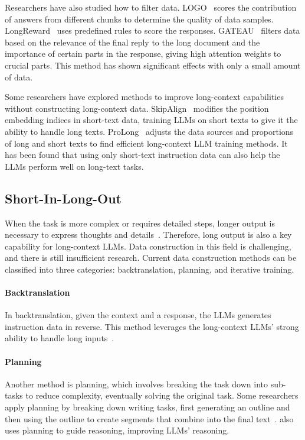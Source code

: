 Researchers have also studied how to filter data. LOGO~\citep{tang2024logo} scores the contribution of answers from different chunks to determine the quality of data samples. LongReward~\citep{zhang2024longreward} uses predefined rules to score the responses. GATEAU~\citep{si2024selecting} filters data based on the relevance of the final reply to the long document and the importance of certain parts in the response, giving high attention weights to crucial parts. This method has shown significant effects with only a small amount of data.

Some researchers have explored methods to improve long-context capabilities without constructing long-context data. SkipAlign~\citep{wu2024skipalign} modifies the position embedding indices in short-text data, training LLMs on short texts to give it the ability to handle long texts. ProLong~\citep{gao2024train} adjusts the data sources and proportions of long and short texts to find efficient long-context LLM training methods. It has been found that using only short-text instruction data can also help the LLMs perform well on long-text tasks.

\subsection{Short-In-Long-Out}

When the task is more complex or requires detailed steps, longer output is necessary to express thoughts and details~\citep{wei2022chain, yao2024tree}. Therefore, long output is also a key capability for long-context LLMs. Data construction in this field is challenging, and there is still insufficient research. Current data construction methods can be classified into three categories: backtranslation, planning, and iterative training.
\paragraph{Backtranslation}
In backtranslation, given the context and a response, the LLMs generates instruction data in reverse. This method leverages the long-context LLMs' strong ability to handle long inputs~\citep{pham2024suri}.
\paragraph{Planning}
Another method is planning, which involves breaking the task down into sub-tasks to reduce complexity, eventually solving the original task. Some researchers apply planning by breaking down writing tasks, first generating an outline and then using the outline to create segments that combine into the final text~\citep{bai2024longwriter, liang2024integrating}. \citet{li2024large} also uses planning to guide reasoning, improving LLMs' reasoning.
